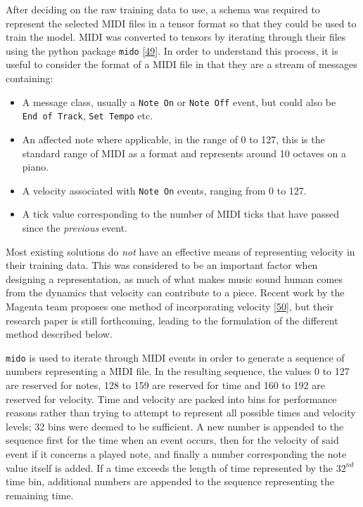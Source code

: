 \documentclass[12pt,]{article}
\providecommand{\tightlist}{%
  \setlength{\itemsep}{0pt}\setlength{\parskip}{0pt}}
\begin{document}
After deciding on the raw training data to use, a schema was required to
represent the selected MIDI files in a tensor format so that they could
be used to train the model. MIDI was converted to tensors by iterating
through their files using the python package \texttt{mido}
{[}\protect\hyperlink{ref-mido}{49}{]}. In order to understand this
process, it is useful to consider the format of a MIDI file in that they
are a stream of messages containing:

\begin{itemize}
\tightlist
\item
  A message class, usually a \texttt{Note\ On} or \texttt{Note\ Off}
  event, but could also be \texttt{End\ of\ Track}, \texttt{Set\ Tempo}
  etc.
\item
  An affected note where applicable, in the range of 0 to 127, this is
  the standard range of MIDI as a format and represents around 10
  octaves on a piano.
\item
  A velocity associated with \texttt{Note\ On} events, ranging from 0 to
  127.
\item
  A tick value corresponding to the number of MIDI ticks that have
  passed since the \emph{previous} event.
\end{itemize}

Most existing solutions do \emph{not} have an effective means of
representing velocity in their training data. This was considered to be
an important factor when designing a representation, as much of what
makes music sound human comes from the dynamics that velocity can
contribute to a piece. Recent work by the Magenta team proposes one
method of incorporating velocity
{[}\protect\hyperlink{ref-performance-rnn-2017}{50}{]}, but their
research paper is still forthcoming, leading to the formulation of the
different method described below.

\texttt{mido} is used to iterate through MIDI events in order to
generate a sequence of numbers representing a MIDI file. In the
resulting sequence, the values 0 to 127 are reserved for notes, 128 to
159 are reserved for time and 160 to 192 are reserved for velocity. Time
and velocity are packed into bins for performance reasons rather than
trying to attempt to represent all possible times and velocity levels;
32 bins were deemed to be sufficient. A new number is appended to the
sequence first for the time when an event occurs, then for the velocity
of said event if it concerns a played note, and finally a number
corresponding the note value itself is added. If a time exceeds the
length of time represented by the \(32^{nd}\) time bin, additional
numbers are appended to the sequence representing the remaining time.
\end{document}
